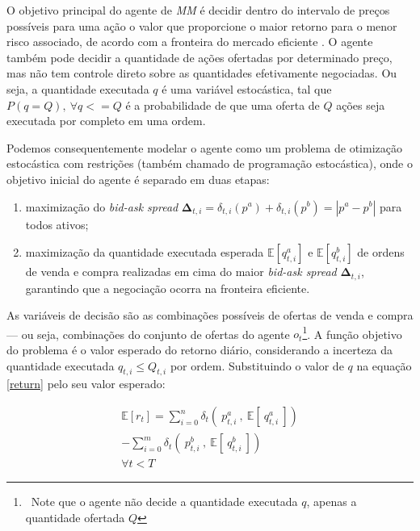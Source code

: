 O objetivo principal do agente de \textit{MM} é decidir dentro do intervalo de preços possíveis para uma ação o valor que proporcione o maior retorno para o menor risco associado, de acordo com a fronteira do mercado eficiente \citep{markowitz1952}. O agente também pode decidir a quantidade de ações ofertadas por determinado preço, mas não tem controle direto sobre as quantidades efetivamente negociadas. Ou seja, a quantidade executada $q$ é uma variável estocástica, tal que $P(q = Q), \ \forall q <= Q$ é a probabilidade de que uma oferta de $Q$ ações seja executada por completo em uma ordem. 

Podemos consequentemente modelar o agente como um problema de otimização estocástica com restrições (também chamado de programação estocástica), onde o objetivo inicial do agente é separado em duas etapas: 

\begin{enumerate}[]
	\item maximização do \textit{bid-ask spread} $\mathbf{\Delta}_{t,i} = \delta_{t, i}(p^{a}) + \delta_{t, i}(p^{b}) = |p^{a} - p^{b}|$  para todos ativos;
	
	\item maximização da quantidade executada esperada $\mathbb{E} [q_{t, i}^{a}]$ e $\mathbb{E} [q_{t, i}^{b}]$ de ordens de venda e compra realizadas em cima do maior \textit{bid-ask spread} $\mathbf{\Delta}_{t, i}$, garantindo que a negociação ocorra na fronteira eficiente.
\end{enumerate}

As variáveis de decisão são as combinações possíveis de ofertas de venda e compra — ou seja, combinações do conjunto de ofertas do agente $o_{t}$\footnote{\ Note que o agente não decide a quantidade executada $q$, apenas a quantidade ofertada $Q$}. A função objetivo do problema é o valor esperado do retorno diário, considerando a incerteza da quantidade executada $q_{t, i} \leq Q_{t, i}$ por ordem. Substituindo o valor de $q$ na equação \ref{return} pelo seu valor esperado:

\begin{equation}
	\begin{aligned}
		\mathbb{E} [r_{t}] = 
		\sum_{i = 0}^{n} \delta_{t}(\ p_{t, i}^{a}\ ,\ \mathbb{E} [\ q_{t, i}^{a}\ ]) \\
		-\sum_{i = 0}^{m} \delta_{t}(\ p_{t, i}^{b}\ ,\ \mathbb{E} [\ q_{t, i}^{b}\ ]) \\
		\forall t < T
	\end{aligned}
\end{equation}

